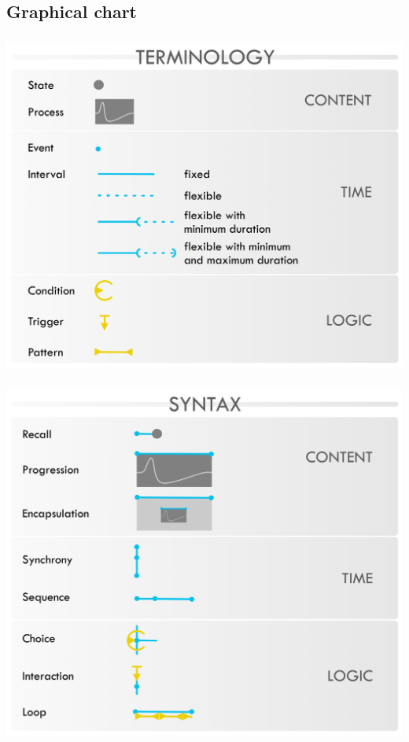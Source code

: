 \documentclass[12pt,t]{beamer}
\makeatletter
\newcommand*{\currentname}{\@currentlabelname}
\makeatother
\begin{document}
\subsection{Graphical chart}
\begin{frame}
    \frametitle{\currentname}
    \centering
    \includegraphics[scale=0.057]{images/terminology.jpg}
\end{frame}
\begin{frame}
    \frametitle{\currentname}
    \centering
    \includegraphics[scale=0.055]{images/syntax.jpg}
\end{frame}
\end{document}
